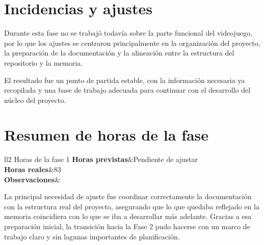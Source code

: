 \section{Incidencias y ajustes}
Durante esta fase no se trabajó todavía sobre la parte funcional del videojuego, por lo que los ajustes
se centraron principalmente en la organización del proyecto, la preparación de la documentación y la
alineación entre la estructura del repositorio y la memoria.

El resultado fue un punto de partida estable, con la información necesaria ya recopilada y una base de
trabajo adecuada para continuar con el desarrollo del núcleo del proyecto.

\section{Resumen de horas de la fase}

\begin{table}[htb]
	\centering
	\begin{coolTable}{ll}{2}
{Horas de la fase 1}
	\textbf{Horas previstas}&Pendiente de ajustar\\
	\textbf{Horas reales}&83\\
	\textbf{Observaciones}&\\
	\end{coolTable}
	\caption{Resumen de horas de la Fase 1}
\end{table}

La principal necesidad de ajuste fue coordinar correctamente la documentación con la estructura real
del proyecto, asegurando que lo que quedaba reflejado en la memoria coincidiera con lo que se iba a
desarrollar más adelante. Gracias a esa preparación inicial, la transición hacia la Fase 2 pudo hacerse
con un marco de trabajo claro y sin lagunas importantes de planificación.
